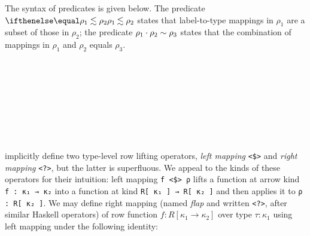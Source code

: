 \documentclass[authoryear, acmsmall, screen, review, nonacm]{acmart}
\begin{document}
The syntax of predicates is given below. The predicate $\LeqP {\rho_1} {\rho_2}$ states that label-to-type mappings in $\rho_1$ are a subset of those in $\rho_2$; the predicate $\rho_1 \cdot \rho_2 \sim \rho_3$ states that the combination of mappings in $\rho_1$ and $\rho_2$ equals $\rho_3$.

\begin{code}%
\>[0]\AgdaSpace{}%
\AgdaSpace{}%
\AgdaSpace{}%
\<%
\\
\>[0][@{}l@{\AgdaIndent{0}}]%
\>[2]\AgdaSpace{}%
\AgdaSymbol{:}\<%
\\
\>[2][@{}l@{\AgdaIndent{0}}]%
\>[4]\AgdaSymbol{(}\AgdaSpace{}%
\AgdaSpace{}%
\AgdaSpace{}%
\AgdaSymbol{:}\AgdaSpace{}%
\AgdaSpace{}%
\AgdaSpace{}%
\AgdaOperator{\AgdaInductiveConstructor{R[}}\AgdaSpace{}%
\AgdaSpace{}%
\AgdaOperator{\AgdaInductiveConstructor{]}}\AgdaSymbol{)}\AgdaSpace{}%
\<%
\\
%
\>[4]\AgdaSpace{}%
\AgdaSpace{}%
\AgdaOperator{\AgdaInductiveConstructor{R[}}\AgdaSpace{}%
\AgdaSpace{}%
\AgdaOperator{\AgdaInductiveConstructor{]}}\<%
\\
%
\\[\AgdaEmptyExtraSkip]%
%
\>[2]\AgdaSpace{}%
\AgdaSymbol{:}\<%
\\
\>[2][@{}l@{\AgdaIndent{0}}]%
\>[4]\AgdaSymbol{(}\AgdaSpace{}%
\AgdaSpace{}%
\AgdaSymbol{:}\AgdaSpace{}%
\AgdaSpace{}%
\AgdaSpace{}%
\AgdaOperator{\AgdaInductiveConstructor{R[}}\AgdaSpace{}%
\AgdaSpace{}%
\AgdaOperator{\AgdaInductiveConstructor{]}}\AgdaSymbol{)}\AgdaSpace{}%
\<%
\\
%
\>[4]\AgdaSpace{}%
\AgdaSpace{}%
\AgdaOperator{\AgdaInductiveConstructor{R[}}\AgdaSpace{}%
\AgdaSpace{}%
\AgdaOperator{\AgdaInductiveConstructor{]}}\<%
\end{code}

\citet{HubersM23} implicitly define two type-level row lifting operators, \emph{left mapping} \verb!<$>! and \emph{right mapping} \verb!<?>!, but the latter is superfluous. We appeal to the kinds of these operators for their intuition: left mapping \verb!f <$> ρ! lifts a function at arrow kind \verb!f : κ₁ → κ₂! into a function at kind \verb!R[ κ₁ ] → R[ κ₂ ]! and then applies it to \verb!ρ : R[ κ₂ ]!. We may define right mapping (named \emph{flap} and written \verb!<?>!, after similar Haskell operators) of row function $f : R[ \kappa_1 \to \kappa_2 ]$ over type $\tau : \kappa_1$ using left mapping under the following identity:
\end{document}
